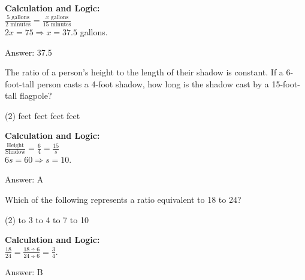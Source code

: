 \documentclass[11pt,paper=a4,answers]{exam}
\begin{document}
\begin{questions}
\begin{solution}
\textbf{Calculation and Logic:} \\
$\frac{5 \text{ gallons}}{2 \text{ minutes}} = \frac{x \text{ gallons}}{15 \text{ minutes}}$ \\
$2x = 75 \Rightarrow x = 37.5$ gallons.

\vspace{30pt}

Answer: \colorbox{yellow!100}{37.5}
\end{solution}

\vspace{60pt}

\question
The ratio of a person’s height to the length of their shadow is constant. If a 6-foot-tall person casts a 4-foot shadow, how long is the shadow cast by a 15-foot-tall flagpole?
\begin{tasks}(2)
     feet
     feet
     feet
     feet
\end{tasks}

\begin{solution}
\textbf{Calculation and Logic:} \\
$\frac{\text{Height}}{\text{Shadow}} = \frac{6}{4} = \frac{15}{s}$ \\
$6s = 60 \Rightarrow s = 10$.

\vspace{30pt}

Answer: \colorbox{yellow!100}{A}
\end{solution}

\vspace{60pt}

\question
Which of the following represents a ratio equivalent to 18 to 24?
\begin{tasks}(2)
     to 3
     to 4
     to 7
     to 10
\end{tasks}

\begin{solution}
\textbf{Calculation and Logic:} \\
$\frac{18}{24} = \frac{18 \div 6}{24 \div 6} = \frac{3}{4}$.

\vspace{30pt}

Answer: \colorbox{yellow!100}{B}
\end{solution}


\end{questions}
\end{document}
